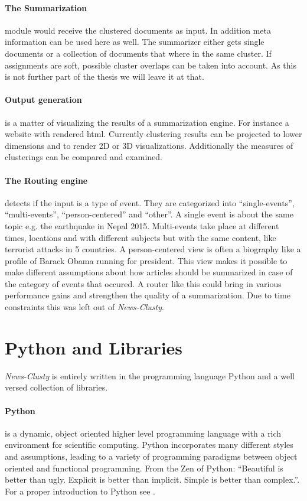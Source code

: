   \paragraph{The Summarization} module would receive the clustered documents as input. In addition meta information can be used here as well. The summarizer either gets single documents or a collection of documents that where in the same cluster. If assignments are soft, possible cluster overlaps can be taken into account. As this is not further part of the thesis we will leave it at that.

  \paragraph{Output generation} is a matter of visualizing the results of a summarization engine. For instance a website with rendered html. Currently clustering results can be projected to lower dimensions and to render 2D or 3D visualizations. Additionally the measures of clusterings can be compared and examined.

  \paragraph{The Routing engine} detects if the input is a type of event. They are categorized into ``single-events'', ``multi-events'', ``person-centered'' and ``other''. A single event is about the same topic e.g. the earthquake in Nepal 2015. Multi-events take place at different times, locations and with different subjects but with the same content, like terrorist attacks in 5 countries. A person-centered view is often a biography like a profile of Barack Obama running for president. This view makes it possible to make different assumptions about how articles should be summarized in case of the category of events that occured. A router like this could bring in various performance gains and strengthen the quality of a summarization. Due to time constraints this was left out of \emph{News-Clusty}.

\section{Python and Libraries}
\label{sec:python_and_libraries}

  \emph{News-Clusty} is entirely written in the programming language Python and a well versed collection of libraries.

  \paragraph{Python} is a dynamic, object oriented higher level programming language with a rich environment for scientific computing. Python incorporates many different styles and assumptions, leading to a variety of programming paradigms between object oriented and functional programming. From the Zen of Python: ``Beautiful is better than ugly. Explicit is better than implicit. Simple is better than complex.''. For a proper introduction to Python see \cite{NltkPython}.

